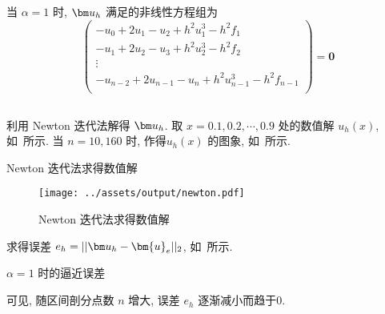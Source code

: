 \documentclass{nedsart}
\begin{document}
\subsection[第5题]{}
当 $\alpha = 1$ 时, $\uh$ 满足的非线性方程组为
\begin{equation}\label{eq:ans2}
    \begin{pmatrix}
        - u_0 + 2 u_1 - u_2 + h^2 u_1^3 - h^2 f_1 \\
        - u_1 + 2 u_2 - u_3 + h^2 u_2^3 - h^2 f_2 \\
        \vdots \\
        - u_{n-2} + 2 u_{n-1} - u_n + h^2 u_{n-1}^3 - h^2 f_{n-1} \\
    \end{pmatrix}
    = \bm{0}
\end{equation}

\subsection[第6题]{}
利用 Newton 迭代法解得 $\uh$. 取 $ x = 0.1, 0.2, \cdots, 0.9$ 处的数值解 $u_h(x)$, 如~所示. 当 $n = 10, 160$ 时, 作得$u_h(x)$ 的图象, 如~所示.
\begin{table}[H]
    \small\centering
    \caption{Newton 迭代法求得数值解}\label{tab:newton}
\end{table}
\begin{figure}[H]
    \centering
    \texttt{[image: ../assets/output/newton.pdf]}
    \caption{Newton 迭代法求得数值解}\label{fig:newton}
\end{figure}\noindent

求得误差 $e_h = ||\uh - \bm{u}_e||_2$, 如~所示.
\begin{table}[H]
    \small\centering
    \caption{$\alpha = 1$ 时的逼近误差}\label{tab:newton-error}
\end{table}\noindent
可见, 随区间剖分点数 $n$ 增大, 误差 $e_h$ 逐渐减小而趋于0. 
\end{document}
